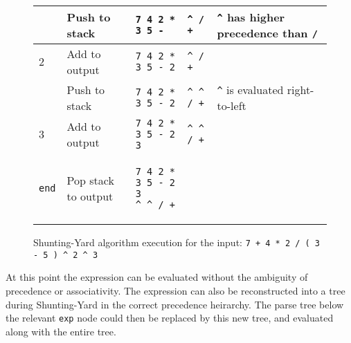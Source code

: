 \begin{figure}[H]
\begin{center}
\begin{tabular}{| m{1.2cm} | m{3.1cm} | m{3.6cm} | m{2.3cm} | m{3.5cm} |}
            \hline
            $\hat{}$ & Push to stack & \verb|7 4 2 * 3 5 -| & \verb|^ / +| & \verb|^| has higher precedence than \verb|/|\\
            \hline
            $2$ & Add to output & \verb|7 4 2 * 3 5 - 2| & \verb|^ / +| &\\
            \hline
            $\hat{}$ & Push to stack & \verb|7 4 2 * 3 5 - 2| & \verb|^ ^ / +| & \verb|^| is evaluated right-to-left\\
            \hline
            $3$ & Add to output & \verb|7 4 2 * 3 5 - 2 3| & \verb|^ ^ / +| &\\
            \hline
            \verb|end| & Pop stack to output & \begin{verbatim}
7 4 2 * 3 5 - 2 3
^ ^ / +
            \end{verbatim} & & \\
            \hline
        \end{tabular}
    \cprotect\caption{\label{fig:4.7}Shunting-Yard algorithm execution for the input: \verb|7 + 4 * 2 / ( 3 - 5 ) ^ 2 ^ 3|}
    \end{center}
\end{figure}

At this point the expression can be evaluated without the ambiguity of precedence or associativity. The expression can also be reconstructed into a tree during Shunting-Yard in the correct precedence heirarchy. The parse tree below the relevant \verb|exp| node could then be replaced by this new tree, and evaluated along with the entire tree.
